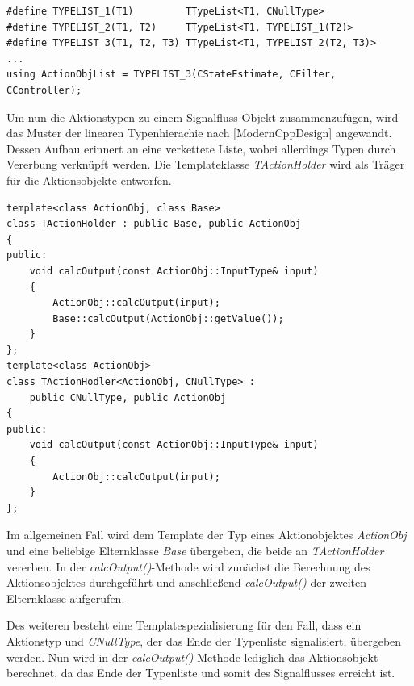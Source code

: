 \begin{lstlisting}[caption={Definition und Aufruf der Makors für verlängerte Typenlisten},captionpos=b]
#define TYPELIST_1(T1)         TTypeList<T1, CNullType>
#define TYPELIST_2(T1, T2) 	   TTypeList<T1, TYPELIST_1(T2)>
#define TYPELIST_3(T1, T2, T3) TTypeList<T1, TYPELIST_2(T2, T3)>
...
using ActionObjList = TYPELIST_3(CStateEstimate, CFilter, CController);
\end{lstlisting}
Um nun die Aktionstypen zu einem Signalfluss-Objekt zusammenzufügen, wird das Muster der linearen Typenhierachie nach  [ModernCppDesign] angewandt. Dessen Aufbau erinnert an eine verkettete Liste, wobei allerdings Typen durch Vererbung verknüpft werden. Die Templateklasse \textit{TActionHolder} wird als Träger für die Aktionsobjekte entworfen.\begin{lstlisting}[caption={Implementierung der Trägerklasse für Aktionsobjekte},captionpos=b]
template<class ActionObj, class Base>
class TActionHolder : public Base, public ActionObj
{
public:
	void calcOutput(const ActionObj::InputType& input)
	{
		ActionObj::calcOutput(input);
		Base::calcOutput(ActionObj::getValue());
	}
};
template<class ActionObj>
class TActionHodler<ActionObj, CNullType> : 
	public CNullType, public ActionObj
{
public:
	void calcOutput(const ActionObj::InputType& input)
	{
		ActionObj::calcOutput(input);
	}
};
\end{lstlisting}
Im allgemeinen Fall wird dem Template der Typ eines Aktionobjektes \textit{ActionObj} und eine beliebige Elternklasse \textit{Base} übergeben, die beide an \textit{TActionHolder} vererben. In der \textit{calcOutput()}-Methode wird zunächst die Berechnung des Aktionsobjektes durchgeführt und anschließend \textit{calcOutput()} der zweiten Elternklasse aufgerufen.

Des weiteren besteht eine Templatespezialisierung für den Fall, dass ein Aktionstyp und \textit{CNullType}, der das Ende der Typenliste signalisiert, übergeben werden. Nun wird in der \textit{calcOutput()}-Methode lediglich das Aktionsobjekt berechnet, da das Ende der Typenliste und somit des Signalflusses erreicht ist.

